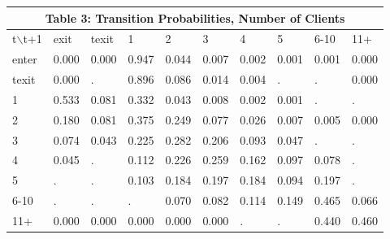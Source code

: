 \documentclass[notes=show]{beamer}
\begin{document}
\begin{frame}%


\begin{tabular}{llllllllll}
\multicolumn{10}{c}{\small Table 3: Transition Probabilities, Number of
Clients} \\ \hline\hline
{\small t}$\backslash ${\small t+1} & {\small exit} & {\small texit} & 
{\small 1} & {\small 2} & {\small 3} & {\small 4} & {\small 5} & {\small 6-10%
} & {\small 11+} \\ \hline
{\small enter} & {\small 0.000} & {\small 0.000} & {\small 0.947} & {\small %
0.044} & {\small 0.007} & {\small 0.002} & {\small 0.001} & {\small 0.001} & 
{\small 0.000} \\ 
{\small texit} & {\small 0.000} & {\small .} & {\small 0.896} & {\small 0.086%
} & {\small 0.014} & {\small 0.004} & {\small .} & {\small .} & {\small 0.000%
} \\ 
{\small 1} & {\small 0.533} & {\small 0.081} & {\small 0.332} & {\small 0.043%
} & {\small 0.008} & {\small 0.002} & {\small 0.001} & {\small .} & {\small .%
} \\ 
{\small 2} & {\small 0.180} & {\small 0.081} & {\small 0.375} & {\small 0.249%
} & {\small 0.077} & {\small 0.026} & {\small 0.007} & {\small 0.005} & 
{\small 0.000} \\ 
{\small 3} & {\small 0.074} & {\small 0.043} & {\small 0.225} & {\small 0.282%
} & {\small 0.206} & {\small 0.093} & {\small 0.047} & {\small .} & {\small .%
} \\ 
{\small 4} & {\small 0.045} & {\small .} & {\small 0.112} & {\small 0.226} & 
{\small 0.259} & {\small 0.162} & {\small 0.097} & {\small 0.078} & {\small .%
} \\ 
{\small 5} & {\small .} & {\small .} & {\small 0.103} & {\small 0.184} & 
{\small 0.197} & {\small 0.184} & {\small 0.094} & {\small 0.197} & {\small .%
} \\ 
{\small 6-10} & {\small .} & {\small .} & {\small .} & {\small 0.070} & 
{\small 0.082} & {\small 0.114} & {\small 0.149} & {\small 0.465} & {\small %
0.066} \\ 
{\small 11+} & {\small 0.000} & {\small 0.000} & {\small 0.000} & {\small %
0.000} & {\small 0.000} & {\small .} & {\small .} & {\small 0.440} & {\small %
0.460} \\ \hline
\end{tabular}%
{\small \ }

\end{frame}%
\end{document}
